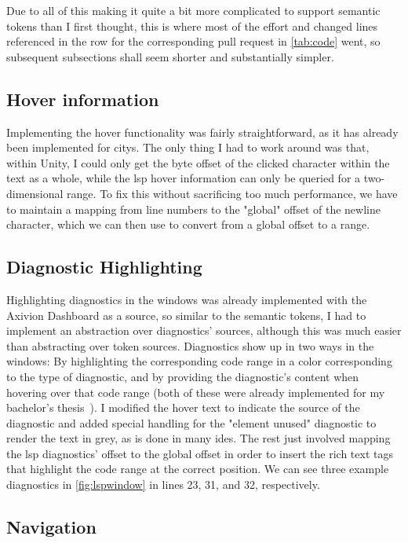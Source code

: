 \documentclass[../thesis]{subfiles}
\begin{document}
Due to all of this making it quite a bit more complicated to support semantic tokens than I first thought, this is where most of the effort and changed lines referenced in the row for the corresponding pull request in \cref{tab:code} went,
so subsequent subsections shall seem shorter and substantially simpler.

\subsection{Hover information}
Implementing the hover functionality was fairly straightforward, as it has already been implemented for \glspl{city}.
The only thing I had to work around was that, within Unity, I could only get the byte offset of the clicked character within the text as a whole, while the \gls{lsp} hover information can only be queried for a two-dimensional \gls{range}.
To fix this without sacrificing too much performance, we have to maintain a mapping from line numbers to the "global" offset of the newline character, which we can then use to convert from a global offset to a \gls{range}.

\subsection{Diagnostic Highlighting}
Highlighting diagnostics in the \glspl{window} was already implemented with the Axivion Dashboard as a source, so
similar to the semantic tokens, I had to implement an abstraction over diagnostics' sources, although this was much easier than abstracting over token sources.
Diagnostics show up in two ways in the \glspl{window}:
By highlighting the corresponding code range in a color corresponding to the type of diagnostic, and by providing the diagnostic's content when hovering over that code range (both of these were already implemented for my bachelor's thesis~\cite{galperin2021}).
I modified the hover text to indicate the source of the diagnostic and added special handling for the "element unused" diagnostic to render the text in grey, as is done in many \glspl{ide}.
The rest just involved mapping the \gls{lsp} diagnostics' offset to the global offset in order to insert the rich text tags that highlight the code range at the correct position.
We can see three example diagnostics in \cref{fig:lspwindow} in lines 23, 31, and 32, respectively.

\subsection{Navigation}
\end{document}
